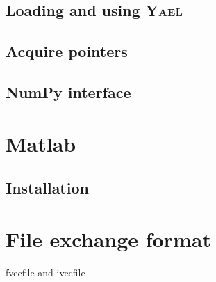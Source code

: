 \documentclass[a4paper,11pt,notitlepage,final,twoside]{report}
\newcommand{\yael}{\textsc{Yael}}
\begin{document}
\section{Loading and using \yael}

\section{Acquire pointers}

\section{NumPy interface}


\chapter{Matlab}

\section{Installation}



\appendix                     %

\chapter{File exchange format}               %

fvecfile and ivecfile




\end{document}
